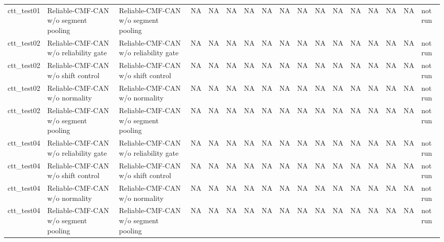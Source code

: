 \begin{tabular}{lllrrrrrrrrrrrrll}
ctt\_test01 & Reliable-CMF-CAN w/o segment pooling & Reliable-CMF-CAN w/o segment pooling & NA & NA & NA & NA & NA & NA & NA & NA & NA & NA & NA & NA & NA & not run \\
ctt\_test02 & Reliable-CMF-CAN w/o reliability gate & Reliable-CMF-CAN w/o reliability gate & NA & NA & NA & NA & NA & NA & NA & NA & NA & NA & NA & NA & NA & not run \\
ctt\_test02 & Reliable-CMF-CAN w/o shift control & Reliable-CMF-CAN w/o shift control & NA & NA & NA & NA & NA & NA & NA & NA & NA & NA & NA & NA & NA & not run \\
ctt\_test02 & Reliable-CMF-CAN w/o normality & Reliable-CMF-CAN w/o normality & NA & NA & NA & NA & NA & NA & NA & NA & NA & NA & NA & NA & NA & not run \\
ctt\_test02 & Reliable-CMF-CAN w/o segment pooling & Reliable-CMF-CAN w/o segment pooling & NA & NA & NA & NA & NA & NA & NA & NA & NA & NA & NA & NA & NA & not run \\
ctt\_test04 & Reliable-CMF-CAN w/o reliability gate & Reliable-CMF-CAN w/o reliability gate & NA & NA & NA & NA & NA & NA & NA & NA & NA & NA & NA & NA & NA & not run \\
ctt\_test04 & Reliable-CMF-CAN w/o shift control & Reliable-CMF-CAN w/o shift control & NA & NA & NA & NA & NA & NA & NA & NA & NA & NA & NA & NA & NA & not run \\
ctt\_test04 & Reliable-CMF-CAN w/o normality & Reliable-CMF-CAN w/o normality & NA & NA & NA & NA & NA & NA & NA & NA & NA & NA & NA & NA & NA & not run \\
ctt\_test04 & Reliable-CMF-CAN w/o segment pooling & Reliable-CMF-CAN w/o segment pooling & NA & NA & NA & NA & NA & NA & NA & NA & NA & NA & NA & NA & NA & not run \\
\bottomrule
\end{tabular}
